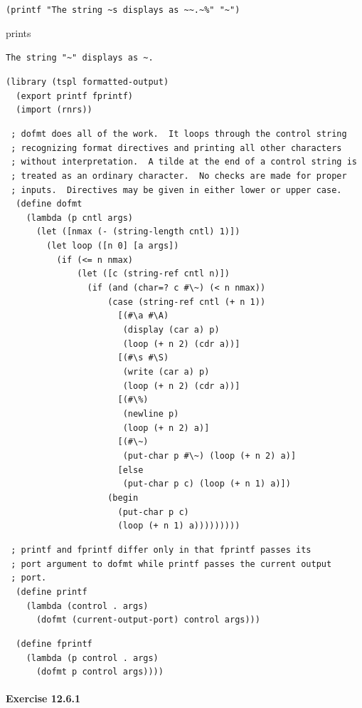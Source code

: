 \texttt{(printf "The string \~{}s displays as \~{}\~{}.\~{}\%{}" "\~{}")}

prints


\texttt{The string "\~{}" displays as \~{}.}

\begin{alltt}
(library (tspl formatted-output)
  (export printf fprintf)
  (import (rnrs))

 ; dofmt does all of the work.  It loops through the control string
 ; recognizing format directives and printing all other characters
 ; without interpretation.  A tilde at the end of a control string is
 ; treated as an ordinary character.  No checks are made for proper
 ; inputs.  Directives may be given in either lower or upper case.
  (define dofmt
    (lambda (p cntl args)
      (let ([nmax (- (string-length cntl) 1)])
        (let loop ([n 0] [a args])
          (if (\textless{}= n nmax)
              (let ([c (string-ref cntl n)])
                (if (and (char=? c \#{}\textbackslash{}\~{}) (\textless{} n nmax))
                    (case (string-ref cntl (+ n 1))
                      [(\#{}\textbackslash{}a \#{}\textbackslash{}A)
                       (display (car a) p)
                       (loop (+ n 2) (cdr a))]
                      [(\#{}\textbackslash{}s \#{}\textbackslash{}S)
                       (write (car a) p)
                       (loop (+ n 2) (cdr a))]
                      [(\#{}\textbackslash{}\%{})
                       (newline p)
                       (loop (+ n 2) a)]
                      [(\#{}\textbackslash{}\~{})
                       (put-char p \#{}\textbackslash{}\~{}) (loop (+ n 2) a)]
                      [else
                       (put-char p c) (loop (+ n 1) a)])
                    (begin
                      (put-char p c)
                      (loop (+ n 1) a)))))))))

 ; printf and fprintf differ only in that fprintf passes its
 ; port argument to dofmt while printf passes the current output
 ; port.
  (define printf
    (lambda (control . args)
      (dofmt (current-output-port) control args)))

  (define fprintf
    (lambda (p control . args)
      (dofmt p control args))))
\end{alltt}

\paragraph{Exercise \label{examples_g181}12.6.1}


